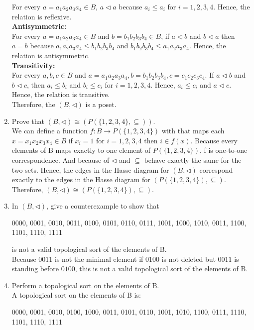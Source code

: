 \documentclass[12pt]{article}
\begin{document}
\begin{enumerate}
  For every $a = a_1a_2a_3a_4 \in B$, $a \triangleleft a$ because $a_i \leq a_i$ for $i = 1,2,3,4$. Hence, the relation is reflexive.\\
  \textbf{Antisymmetric: }\\
  For every $a = a_1a_2a_3a_4 \in B$ and $b = b_1b_2b_3b_4 \in B$, if $a \triangleleft b$ and $b \triangleleft a$ then $a = b$ because $a_1a_2a_3a_4 \leq b_1b_2b_3b_4$ and $b_1b_2b_3b_4 \leq a_1a_2a_3a_4$. Hence, the relation is antisymmetric. \\
  \textbf{Transitivity: }\\
  For every $a,b,c \in B$ and $a = a_1a_2a_3a_4, b=b_1b_2b_3b_4, c = c_1c_2c_3c_4$. If $a \triangleleft b$ and $b \triangleleft c$, then $a_i \leq b_i$ and $b_i \leq c_i$ for $i = 1,2,3,4$. Hence, $a_i \leq c_i$ and $a \triangleleft c$. Hence, the relation is transitive.\\
  Therefore, the $(B, \triangleleft)$ is a poset.
  \item Prove that $(B, \triangleleft) \cong (P(\{1,2,3,4\}, \subseteq))$.\\
  We can define a function $f: B \to P(\{1,2,3,4\})$ with that maps each $x = x_1x_2x_3x_4 \in B$ if $x_i = 1$ for $i = 1,2,3,4$ then $i \in f(x)$. Because every elements of B maps exactly to one element of $P(\{1,2,3,4\})$, f is one-to-one correspondence. And because of $\triangleleft$ and $\subseteq$ behave exactly the same for the two sets. Hence, the edges in the Hasse diagram for $(B, \triangleleft)$ correspond exactly to the edges in the Hasse diagram for $(P(\{1,2,3,4\}), \subseteq)$. Therefore, $(B, \triangleleft) \cong (P(\{1,2,3,4\}), \subseteq)$.
  \item In $(B, \triangleleft)$, give a counterexample to show that\\
  \begin{center}
    0000, 0001, 0010, 0011, 0100, 0101, 0110, 0111, 1001, 1000, 1010, 0011, 1100, 1101, 1110, 1111
  \end{center}
  is not a valid topological sort of the elements of B.\\
  Because $0011$ is not the minimal element if $0100$ is not deleted but $0011$ is standing before $0100$, this is not a valid topological sort of the elements of B. 
  \item Perform a topological sort on the elements of B.\\
  A topological sort on the elements of B is:
  \begin{center}
    0000, 0001, 0010, 0100, 1000, 0011, 0101, 0110, 1001, 1010, 1100, 0111, 1110, 1101, 1110, 1111

\end{center}
\end{enumerate}
\end{document}
